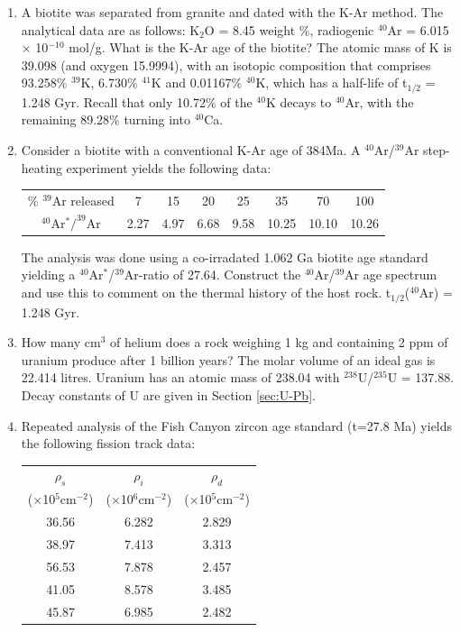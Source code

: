 \documentclass{book}
\begin{document}
\begin{enumerate}
\item A biotite was separated from granite and dated with the K-Ar
  method. The analytical data are as follows: K$_2$O = 8.45 weight \%,
  radiogenic $^{40}$Ar = 6.015 $\times$ 10$^{-10}$ mol/g.  What is the
  K-Ar age of the biotite? The atomic mass of K is 39.098 (and oxygen
  15.9994), with an isotopic composition that comprises 93.258\%
  $^{39}$K, 6.730\% $^{41}$K and 0.01167\% $^{40}$K, which has a
  half-life of t$_{1/2}$ = 1.248 Gyr. Recall that only 10.72\% of the
  $^{40}$K decays to $^{40}$Ar, with the remaining 89.28\% turning
  into $^{40}$Ca. 

\item Consider a biotite with a conventional K-Ar age of 384Ma. A
  $^{40}$Ar/$^{39}$Ar step-heating experiment yields the following
  data:

\begin{table}[!ht]
\centering
\begin{tabular}{c@{~}|@{~}c@{~}c@{~}c@{~}c@{~}c@{~}c@{~}c}
\% $^{39}$Ar released & 7 & 15 & 20 & 25 & 35 & 70 & 100\\
$^{40}$Ar$^*/^{39}$Ar & 2.27 & 4.97 & 6.68 & 9.58 & 10.25 & 10.10 & 10.26 \\
\end{tabular}
\end{table}

The analysis was done using a co-irradated 1.062 Ga biotite age
standard yielding a $^{40}$Ar$^*$/$^{39}$Ar-ratio of 27.64.  Construct
the $^{40}$Ar/$^{39}$Ar age spectrum and use this to comment on the
thermal history of the host rock. t$_{1/2}$($^{40}$Ar) = 1.248
Gyr.\\ 

\item How many cm$^3$ of helium does a rock weighing 1 kg and
  containing 2 ppm of uranium produce after 1 billion years? The molar
  volume of an ideal gas is 22.414 litres. Uranium has an atomic mass
  of 238.04 with $^{238}$U/$^{235}$U = 137.88. Decay constants of U
  are given in Section \ref{sec:U-Pb}.

\item Repeated analysis of the Fish Canyon zircon age standard (t=27.8
  Ma) yields the following fission track data:

\begin{table}[!ht]
\centering
\begin{tabular}{ccc}
$\rho_s$ & $\rho_i$ & $\rho_d$ \\
($\times$10$^5$cm$^{-2}$) & ($\times$10$^6$cm$^{-2}$) & ($\times$10$^5$cm$^{-2}$)\\
\hline
36.56 & 6.282 & 2.829 \\
38.97 & 7.413 & 3.313 \\
56.53 & 7.878 & 2.457 \\
41.05 & 8.578 & 3.485 \\
45.87 & 6.985 & 2.482
\end{tabular}
\end{table}


\end{enumerate}
\end{document}
